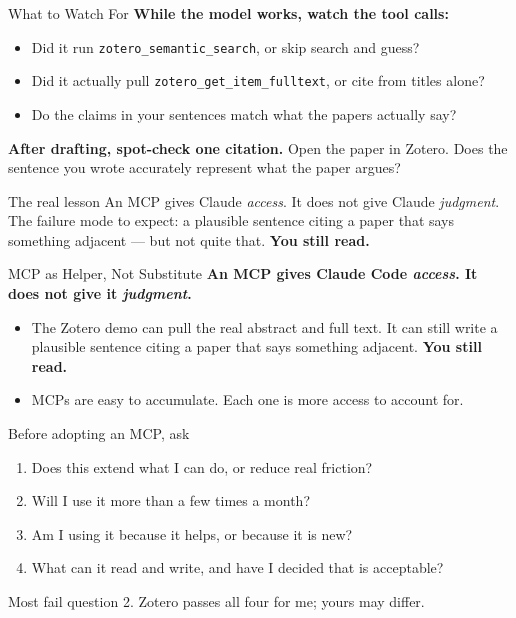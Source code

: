 \documentclass[aspectratio=169, 11pt]{beamer}
\begin{document}
\begin{frame}{What to Watch For}
  \textbf{While the model works, watch the tool calls:}

  \vspace{0.4em}
  \begin{itemize}
    \item Did it run \texttt{zotero\_semantic\_search}, or skip search and guess?
    \item Did it actually pull \texttt{zotero\_get\_item\_fulltext}, or cite from titles alone?
    \item Do the claims in your sentences match what the papers actually say?
  \end{itemize}

  \vspace{0.6em}
  \textbf{After drafting, spot-check one citation.} Open the paper in Zotero. Does the sentence you wrote accurately represent what the paper argues?

  \vspace{0.6em}
  \begin{alertblock}{The real lesson}
    An MCP gives Claude \emph{access}. It does not give Claude \emph{judgment}. The failure mode to expect: a plausible sentence citing a paper that says something adjacent --- but not quite that. \textbf{You still read.}
  \end{alertblock}
\end{frame}


\begin{frame}[shrink=6]{MCP as Helper, Not Substitute}
  \textbf{An MCP gives Claude Code \emph{access}. It does not give it \emph{judgment}.}

  \vspace{0.5em}
  \begin{itemize}
    \item The Zotero demo can pull the real abstract and full text. It can still write a plausible sentence citing a paper that says something adjacent. \textbf{You still read.}
    \item MCPs are easy to accumulate. Each one is more access to account for.
  \end{itemize}

  \vspace{0.5em}
  \begin{block}{Before adopting an MCP, ask}
    \begin{enumerate}
      \item Does this extend what I can do, or reduce real friction?
      \item Will I use it more than a few times a month?
      \item Am I using it because it helps, or because it is new?
      \item What can it read and write, and have I decided that is acceptable?
    \end{enumerate}
  \end{block}

  \vspace{0.3em}
  {\small Most fail question 2. Zotero passes all four for me; yours may differ.}
\end{frame}
\end{document}
